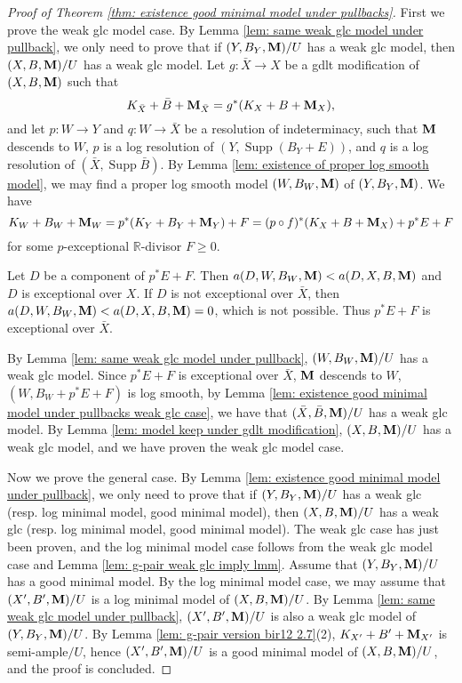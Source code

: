 \documentclass[11pt]{amsart}
\numberwithin{equation}{section}
\newcommand{\Mm}{{\bf{M}}}
\newcommand{\Rr}{\mathbb{R}}
\newcommand{\Supp}{\operatorname{Supp}}
\theoremstyle{definition}
\theoremstyle{definition}
\theoremstyle{definition}
\begin{document}
\begin{proof}[Proof of Theorem \ref{thm: existence good minimal model under pullbacks}]
First we prove the weak glc model case. By Lemma \ref{lem: same weak glc model under pullback}, we only need to prove that if $(Y,B_Y,\Mm)/U$ has a weak glc model, then $(X,B,\Mm)/U$ has a weak glc model. Let $g: \bar X\rightarrow X$ be a gdlt modification of $(X,B,\Mm)$ such that
$$K_{\bar X}+\bar B+\Mm_{\bar X}=g^*(K_X+B+\Mm_X),$$
and let $p: W\rightarrow Y$ and $q: W\rightarrow\bar X$ be a resolution of indeterminacy, such that $\Mm$ descends to $W$, $p$ is a log resolution of $(Y,\Supp(B_Y+E))$, and $q$ is a log resolution of $(\bar X,\Supp\bar B)$.  By Lemma \ref{lem: existence of proper log smooth model}, we may find a proper log smooth model $(W,B_W,\Mm)$ of $(Y,B_Y,\Mm)$. We have
$$K_W+B_W+\Mm_W=p^*(K_Y+B_Y+\Mm_Y)+F=(p\circ f)^*(K_X+B+\Mm_X)+p^*E+F$$
for some $p$-exceptional $\Rr$-divisor $F\geq 0$.

Let $D$ be a component of $p^*E+F$. Then $a(D,W,B_W,\Mm)<a(D,X,B,\Mm)$ and $D$ is exceptional over $X$. If $D$ is not exceptional over $\bar X$, then $a(D,W,B_W,\Mm)<a(D,X,B,\Mm)=0$, which is not possible. Thus $p^*E+F$ is exceptional over $\bar X$. 

By Lemma \ref{lem: same weak glc model under pullback}, $(W,B_W,\Mm)/U$ has a weak glc model. Since $p^*E+F$ is exceptional over $\bar X$, $\Mm$ descends to $W$, $(W,B_W+p^*E+F)$ is log smooth, by Lemma \ref{lem: existence good minimal model under pullbacks weak glc case}, we have that $(\bar X,\bar B,\Mm)/U$ has a weak glc model. By Lemma \ref{lem: model keep under gdlt modification}, $(X,B,\Mm)/U$ has a weak glc model, and we have proven the weak glc model case.

Now we prove the general case. By Lemma \ref{lem: existence good minimal model under pullback}, we only need to prove that if $(Y,B_Y,\Mm)/U$ has a weak glc (resp. log minimal model, good minimal model), then $(X,B,\Mm)/U$ has a weak glc (resp. log minimal model, good minimal model). The weak glc case has just been proven, and the log minimal model case follows from the weak glc model case and Lemma \ref{lem: g-pair weak glc imply lmm}. Assume that $(Y,B_Y,\Mm)/U$ has a good minimal model. By the log minimal model case, we may assume that $(X',B',\Mm)/U$ is a log minimal model of $(X,B,\Mm)/U$. By Lemma \ref{lem: same weak glc model under pullback}, $(X',B',\Mm)/U$ is also a weak glc model of $(Y,B_Y,\Mm)/U$. By Lemma \ref{lem: g-pair version bir12 2.7}(2), $K_{X'}+B'+\Mm_{X'}$ is semi-ample$/U$, hence $(X',B',\Mm)/U$ is a  good minimal model of $(X,B,\Mm)/U$, and the proof is concluded.
\end{proof}
\end{document}

